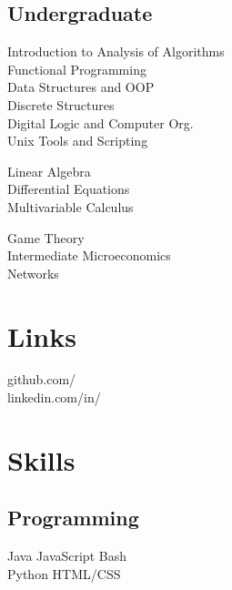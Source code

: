 \documentclass[]{deedy-resume-openfont}
\begin{document}
\begin{minipage}[t]{0.33\textwidth}
\subsection{Undergraduate}
Introduction to Analysis of Algorithms \\
Functional Programming \\
Data Structures and OOP \\
Discrete Structures \\
Digital Logic and Computer Org. \\
Unix Tools and Scripting \newline

Linear Algebra \\
Differential Equations\\
Multivariable Calculus\newline

Game Theory\\
Intermediate Microeconomics\\
Networks \\
\sectionsep


\section{Links} 
github.com/\href{https://github.com/kuang}{} \\
linkedin.com/in/\href{https://www.linkedin.com/in/kuangjustin}{} \\
\sectionsep

\section{Skills}
\subsection{Programming}
Java \textbullet{}   JavaScript \textbullet{} Bash \\
Python \textbullet{} HTML/CSS 
\newline
\newline


\end{minipage}
\end{document}
